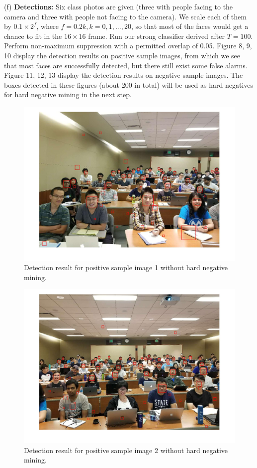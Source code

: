 \documentclass[10pt]{article}
\begin{document}
	(f) \textbf{Detections:} Six class photos are given (three with people facing to the camera and three with people not facing to the camera). We scale each of them by $0.1\times2^f$, where $f=0.2k, k=0,1,...,20$, so that most of the faces would get a chance to fit in the $16\times16$ frame. Run our strong classifier derived after $T=100$. Perform non-maximum suppression with a permitted overlap of 0.05. Figure 8, 9, 10 display the detection results on positive sample images, from which we see that most faces are successfully detected, but there still exist some false alarms. Figure 11, 12, 13 display the detection results on negative sample images. The boxes detected in these figures (about 200 in total) will be used as hard negatives for hard negative mining in the next step. \\
	\newpage\begin{figure}[ht]
		\includegraphics[width=\textwidth]{detection_face_1.jpg}
		\centering
		\caption{Detection result for positive sample image 1 without hard negative mining.}
		\label{8}
	\end{figure}
	\newpage\begin{figure}[ht]
		\includegraphics[width=\textwidth]{detection_face_2.jpg}
		\centering
		\caption{Detection result for positive sample image 2 without hard negative mining.}
		\label{9}
	\end{figure}
\end{document}
